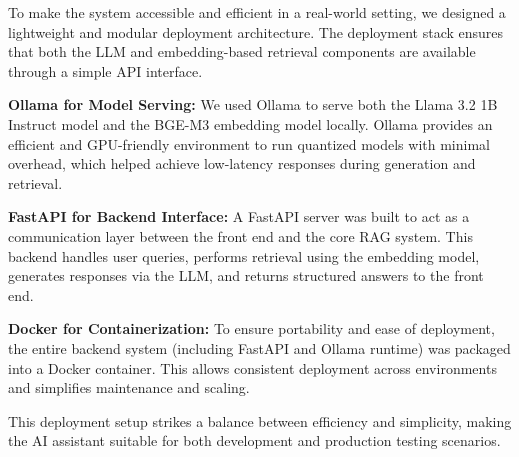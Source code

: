 To make the system accessible and efficient in a real-world setting, we designed a lightweight and modular deployment architecture. The deployment stack ensures that both the LLM and embedding-based retrieval components are available through a simple API interface.

\textbf{Ollama for Model Serving:}
We used Ollama to serve both the Llama 3.2 1B Instruct model and the BGE-M3 embedding model locally. Ollama provides an efficient and GPU-friendly environment to run quantized models with minimal overhead, which helped achieve low-latency responses during generation and retrieval.

\textbf{FastAPI for Backend Interface:}
A FastAPI server was built to act as a communication layer between the front end and the core RAG system. This backend handles user queries, performs retrieval using the embedding model, generates responses via the LLM, and returns structured answers to the front end.

\textbf{Docker for Containerization:}
To ensure portability and ease of deployment, the entire backend system (including FastAPI and Ollama runtime) was packaged into a Docker container. This allows consistent deployment across environments and simplifies maintenance and scaling.

This deployment setup strikes a balance between efficiency and simplicity, making the AI assistant suitable for both development and production testing scenarios.